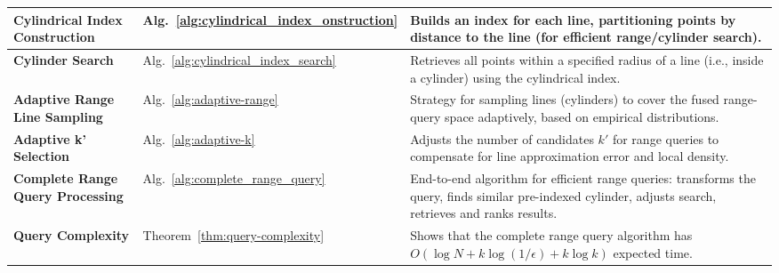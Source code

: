 \documentclass[numbers,sort]{article}
\begin{document}
\begin{longtable}{p{4.5cm} p{1.5cm} p{7.2cm}}
\midrule
\textbf{Cylindrical Index Construction} & Alg.~\ref{alg:cylindrical_index_onstruction} & Builds an index for each line, partitioning points by distance to the line (for efficient range/cylinder search). \\
\midrule
\textbf{Cylinder Search} & Alg.~\ref{alg:cylindrical_index_search} & Retrieves all points within a specified radius of a line (i.e., inside a cylinder) using the cylindrical index. \\
\midrule
\textbf{Adaptive Range Line Sampling} & Alg.~\ref{alg:adaptive-range} & Strategy for sampling lines (cylinders) to cover the fused range-query space adaptively, based on empirical distributions. \\
\midrule
\textbf{Adaptive k' Selection} & Alg.~\ref{alg:adaptive-k} & Adjusts the number of candidates $k'$ for range queries to compensate for line approximation error and local density. \\
\midrule
\textbf{Complete Range Query Processing} & Alg.~\ref{alg:complete_range_query} & End-to-end algorithm for efficient range queries: transforms the query, finds similar pre-indexed cylinder, adjusts search, retrieves and ranks results. \\
\midrule
\textbf{Query Complexity} & Theorem~\ref{thm:query-complexity} & Shows that the complete range query algorithm has $O(\log N + k\log(1/\epsilon) + k\log k)$ expected time. \\
\end{longtable}
\end{document}
